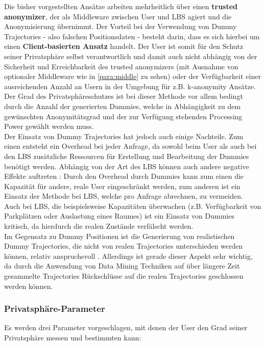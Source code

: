 Die bisher vorgestellten Ansätze arbeiten mehrheitlich über einen \textbf{trusted anonymizer}, der als Middleware zwischen User und LBS agiert und die Anonymisierung übernimmt. Der Vorteil bei der Verwendung von Dummy Trajectories - also falschen Positionsdaten - besteht darin, dass es sich hierbei um einen \textbf{Client-basierten Ansatz} handelt. Der User ist somit für den Schutz seiner Privatsphäre selbst verantwortlich und damit auch nicht abhängig von der Sicherheit und Erreichbarkeit des trusted anonymizers (mit Ausnahme von optionaler Middleware wie in \ref{para:middle} zu sehen) oder der Verfügbarkeit einer ausreichenden Anzahl an Usern in der Umgebung für z.B. k-anonymity Ansätze. Der Grad des Privatsphäreschutzes ist bei dieser Methode vor allem bedingt durch die Anzahl der generierten Dummies, welche in Abhängigkeit zu dem gewünschten Anonymitätsgrad und der zur Verfügung stehenden Processing Power gewählt werden muss.\\
Der Einsatz von Dummy Trajectories hat jedoch auch einige Nachteile. Zum einen entsteht ein Overhead bei jeder Anfrage, da sowohl beim User als auch bei den LBS zusätzliche Ressourcen für Erstellung und Bearbeitung der Dummies benötigt werden. Abhängig von der Art des LBS können auch andere negative Effekte auftreten \cite{Beresford2005}: Durch den Overhead durch Dummies kann zum einen die Kapazität für andere, reale User eingeschränkt werden, zum anderen ist ein Einsatz der Methode bei LBS, welche pro Anfrage abrechnen, zu vermeiden. Auch bei LBS, die beispielsweise Kapazitäten überwachen (z.B. Verfügbarkeit von Parkplätzen oder Auslastung eines Raumes) ist ein Einsatz von Dummies kritisch, da hierdurch die realen Zustände verfälscht werden.\\
Im Gegensatz zu Dummy Positionen ist die Generierung von realistischen Dummy Trajectories, die nicht von realen Trajectories unterschieden werden können, relativ anspruchsvoll \cite{Beresford2003}. Allerdings ist gerade dieser Aspekt sehr wichtig, da durch die Anwendung von Data Mining Techniken auf über längere Zeit gesammelte Trajectories Rückschlüsse auf die realen Trajectories geschlossen werden können. 

\subsubsection{Privatsphäre-Parameter \cite{You2007, Lei2012}} \label{subsubsection:dgparameter}
Es werden drei Parameter vorgeschlagen, mit denen der User den Grad seiner Privatsphäre messen und bestimmten kann:
